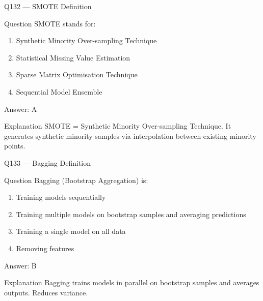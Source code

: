 \documentclass[aspectratio=169,8pt]{beamer}
\begin{document}
	\begin{frame}{Q132 --- SMOTE Definition}
		\begin{block}{Question}
			SMOTE stands for:
			\begin{enumerate}
				\item Synthetic Minority Over-sampling Technique
				\item Statistical Missing Value Estimation
				\item Sparse Matrix Optimisation Technique
				\item Sequential Model Ensemble
			\end{enumerate}
		\end{block}
		\begin{exampleblock}{Answer: A}\end{exampleblock}
		\begin{block}{Explanation}
			SMOTE = Synthetic Minority Over-sampling Technique. It generates synthetic minority samples via interpolation between existing minority points.
		\end{block}
	\end{frame}
	
	\begin{frame}{Q133 --- Bagging Definition}
		\begin{block}{Question}
			Bagging (Bootstrap Aggregation) is:
			\begin{enumerate}
				\item Training models sequentially
				\item Training multiple models on bootstrap samples and averaging predictions
				\item Training a single model on all data
				\item Removing features
			\end{enumerate}
		\end{block}
		\begin{exampleblock}{Answer: B}\end{exampleblock}
		\begin{block}{Explanation}
			Bagging trains models in parallel on bootstrap samples and averages outputs. Reduces variance.
		\end{block}
	\end{frame}
	
\end{document}
